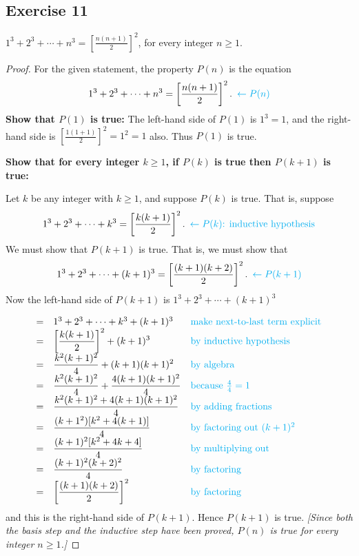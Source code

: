 \documentclass[14pt]{extarticle}
\newcommand{\dps}{\displaystyle}
\newcommand{\from}{\leftarrow}
\newcommand{\cy}{\color{cyan}}
\begin{document}
\subsection{Exercise 11}
$\dps 1^3 + 2^3 + \cdots + n^3 = \left[\frac{n(n+1)}{2}\right]^2$, for every integer $n \geq 1$.

\begin{proof}
For the given statement, the property $P(n)$ is the equation
\[
\dps 1^3 + 2^3 + \cdots + n^3 = \left[\frac{n(n+1)}{2}\right]^2. \,\,\, {\cy \from P(n)}
\]
{\bf Show that $P(1)$ is true:} The left-hand side of $P(1)$ is $1^3 = 1$, and the right-hand side is $\dps \left[ \frac{1(1+1)}{2}\right]^2 = 1^2 = 1$ also. Thus $P(1)$ is true.

{\bf Show that for every integer $k \geq 1$, if $P(k)$ is true then $P(k + 1)$ is true:}

Let $k$ be any integer with $k \geq 1$, and suppose $P(k)$ is true. That is, suppose
\[
\dps 1^3 + 2^3 + \cdots + k^3 = \left[\frac{k(k+1)}{2}\right]^2. \,\,\, {\cy \from P(k) \text{: inductive hypothesis}}
\]
We must show that $P(k + 1)$ is true. That is, we must show that
\[
\dps 1^3 + 2^3 + \cdots + (k+1)^3 = \left[\frac{(k+1)(k+2)}{2}\right]^2. \,\,\,{\cy \from P(k+1)}
\]
Now the left-hand side of $P(k + 1)$ is $1^3 + 2^3 + \cdots + (k+1)^3$

\[
\begin{array}{lll}
= & 1^3 + 2^3 + \cdots + k^3+ (k+1)^3 & \text{\cy make next-to-last term explicit} \\
= & \dps \left[\frac{k(k+1)}{2}\right]^2 + (k+1)^3 & \text{\cy by inductive hypothesis} \\
= & \dps \frac{k^2(k+1)^2}{4} + (k+1)(k+1)^2 & \text{\cy by algebra} \\
= & \dps \frac{k^2(k+1)^2}{4} + \frac{4(k+1)(k+1)^2}{4} & \text{\cy because $\frac{4}{4} = 1$} \\
= & \dps \frac{k^2(k+1)^2 + 4(k+1)(k+1)^2}{4} & \text{\cy by adding fractions} \\
= & \dps \frac{(k+1^2)[k^2 + 4(k+1)]}{4} & \text{\cy by factoring out $(k+1)^2$}  \\
= & \dps \frac{(k+1)^2[k^2+4k+4]}{4} & \text{\cy by multiplying out} \\
= & \dps \frac{(k+1)^2(k+2)^2}{4} & \text{\cy by factoring} \\
= & \dps \left[\frac{(k+1)(k+2)}{2}\right]^2 & \text{\cy by factoring}
\end{array}
\]
and this is the right-hand side of $P(k + 1)$. Hence $P(k + 1)$ is true. {\it [Since both the basis step and the inductive step have been proved, $P(n)$ is true for every integer $n \geq 1$.]}
\end{proof}
\end{document}

